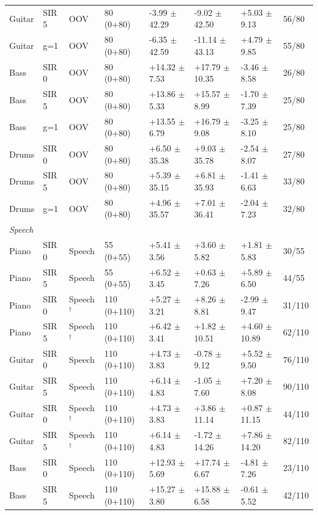 \begin{tabular}{llllllll}
Guitar & SIR 5 & OOV & 80 (0+80) & -3.99 $\pm$ 42.29 & -9.02 $\pm$ 42.50 & +5.03 $\pm$ 9.13 & 56/80\\
Guitar & g=1 & OOV & 80 (0+80) & -6.35 $\pm$ 42.59 & -11.14 $\pm$ 43.13 & +4.79 $\pm$ 9.85 & 55/80\\
Bass & SIR 0 & OOV & 80 (0+80) & +14.32 $\pm$ 7.53 & +17.79 $\pm$ 10.35 & -3.46 $\pm$ 8.58 & 26/80\\
Bass & SIR 5 & OOV & 80 (0+80) & +13.86 $\pm$ 5.33 & +15.57 $\pm$ 8.99 & -1.70 $\pm$ 7.39 & 25/80\\
Bass & g=1 & OOV & 80 (0+80) & +13.55 $\pm$ 6.79 & +16.79 $\pm$ 9.08 & -3.25 $\pm$ 8.10 & 25/80\\
Drums & SIR 0 & OOV & 80 (0+80) & +6.50 $\pm$ 35.38 & +9.03 $\pm$ 35.78 & -2.54 $\pm$ 8.07 & 27/80\\
Drums & SIR 5 & OOV & 80 (0+80) & +5.39 $\pm$ 35.15 & +6.81 $\pm$ 35.93 & -1.41 $\pm$ 6.63 & 33/80\\
Drums & g=1 & OOV & 80 (0+80) & +4.96 $\pm$ 35.57 & +7.01 $\pm$ 36.41 & -2.04 $\pm$ 7.23 & 32/80\\
\midrule
\multicolumn{8}{l}{\emph{Speech}}\\
Piano & SIR 0 & Speech & 55 (0+55) & +5.41 $\pm$ 3.56 & +3.60 $\pm$ 5.82 & +1.81 $\pm$ 5.83 & 30/55\\
Piano & SIR 5 & Speech & 55 (0+55) & +6.52 $\pm$ 3.45 & +0.63 $\pm$ 7.26 & +5.89 $\pm$ 6.50 & 44/55\\
Piano & SIR 0 & Speech$^\dagger$ & 110 (0+110) & +5.27 $\pm$ 3.21 & +8.26 $\pm$ 8.81 & -2.99 $\pm$ 9.47 & 31/110\\
Piano & SIR 5 & Speech$^\dagger$ & 110 (0+110) & +6.42 $\pm$ 3.41 & +1.82 $\pm$ 10.51 & +4.60 $\pm$ 10.89 & 62/110\\
Guitar & SIR 0 & Speech & 110 (0+110) & +4.73 $\pm$ 3.83 & -0.78 $\pm$ 9.12 & +5.52 $\pm$ 9.50 & 76/110\\
Guitar & SIR 5 & Speech & 110 (0+110) & +6.14 $\pm$ 4.83 & -1.05 $\pm$ 7.60 & +7.20 $\pm$ 8.08 & 90/110\\
Guitar & SIR 0 & Speech$^\dagger$ & 110 (0+110) & +4.73 $\pm$ 3.83 & +3.86 $\pm$ 11.14 & +0.87 $\pm$ 11.15 & 44/110\\
Guitar & SIR 5 & Speech$^\dagger$ & 110 (0+110) & +6.14 $\pm$ 4.83 & -1.72 $\pm$ 14.26 & +7.86 $\pm$ 14.20 & 82/110\\
Bass & SIR 0 & Speech & 110 (0+110) & +12.93 $\pm$ 5.69 & +17.74 $\pm$ 6.67 & -4.81 $\pm$ 7.26 & 23/110\\
Bass & SIR 5 & Speech & 110 (0+110) & +15.27 $\pm$ 3.80 & +15.88 $\pm$ 6.58 & -0.61 $\pm$ 5.52 & 42/110\\

\end{tabular}

